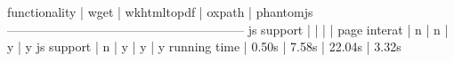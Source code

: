 functionality |  wget  | wkhtmltopdf | oxpath | phantomjs
---------------------------------------------------------
js support    |        |             |        |          
page interat  |   n    |      n      |   y    |    y     
js support    |   n    |      y      |   y    |    y     
running time  | 0.50s  |    7.58s    | 22.04s |  3.32s    

\TODO{}





